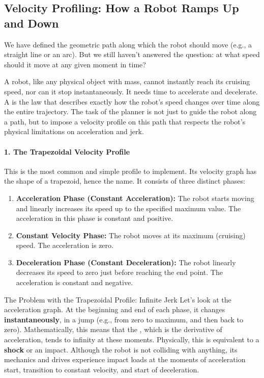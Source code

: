 \subsection{Velocity Profiling: How a Robot Ramps Up and Down}
\label{sec:velocity_profiling}

We have defined the geometric path along which the robot should move (e.g., a straight line or an arc). But we still haven't answered the question: at what speed should it move at any given moment in time?

A robot, like any physical object with mass, cannot instantly reach its cruising speed, nor can it stop instantaneously. It needs time to accelerate and decelerate. A  is the law that describes exactly how the robot's speed changes over time along the entire trajectory. The task of the planner is not just to guide the robot along a path, but to impose a velocity profile on this path that respects the robot's physical limitations on acceleration and jerk.

\paragraph{1. The Trapezoidal Velocity Profile}
This is the most common and simple profile to implement. Its velocity graph has the shape of a trapezoid, hence the name. It consists of three distinct phases:
\begin{enumerate}
    \item \textbf{Acceleration Phase (Constant Acceleration):} The robot starts moving and linearly increases its speed up to the specified maximum value. The acceleration in this phase is constant and positive.
    \item \textbf{Constant Velocity Phase:} The robot moves at its maximum (cruising) speed. The acceleration is zero.
    \item \textbf{Deceleration Phase (Constant Deceleration):} The robot linearly decreases its speed to zero just before reaching the end point. The acceleration is constant and negative.
\end{enumerate}

\begin{dangerbox}{The Problem with the Trapezoidal Profile: Infinite Jerk}
Let's look at the acceleration graph. At the beginning and end of each phase, it changes \textbf{instantaneously}, in a jump (e.g., from zero to maximum, and then back to zero). Mathematically, this means that the , which is the derivative of acceleration, tends to infinity at these moments. Physically, this is equivalent to a \textbf{shock} or an impact. Although the robot is not colliding with anything, its mechanics and drives experience impact loads at the moments of acceleration start, transition to constant velocity, and start of deceleration.
\end{dangerbox}

